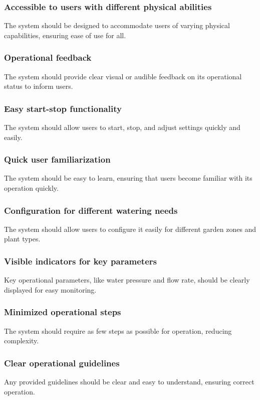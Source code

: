 \documentclass[11pt]{article}
\begin{document}
\subsubsection{Accessible to users with different physical abilities}
The system should be designed to accommodate users of varying physical capabilities, ensuring ease of use for all.

\subsubsection{Operational feedback}
The system should provide clear visual or audible feedback on its operational status to inform users.

\subsubsection{Easy start-stop functionality}
The system should allow users to start, stop, and adjust settings quickly and easily.

\subsubsection{Quick user familiarization}
The system should be easy to learn, ensuring that users become familiar with its operation quickly.

\subsubsection{Configuration for different watering needs}
The system should allow users to configure it easily for different garden zones and plant types.

\subsubsection{Visible indicators for key parameters}
Key operational parameters, like water pressure and flow rate, should be clearly displayed for easy monitoring.

\subsubsection{Minimized operational steps}
The system should require as few steps as possible for operation, reducing complexity.

\subsubsection{Clear operational guidelines}
Any provided guidelines should be clear and easy to understand, ensuring correct operation.
\end{document}
